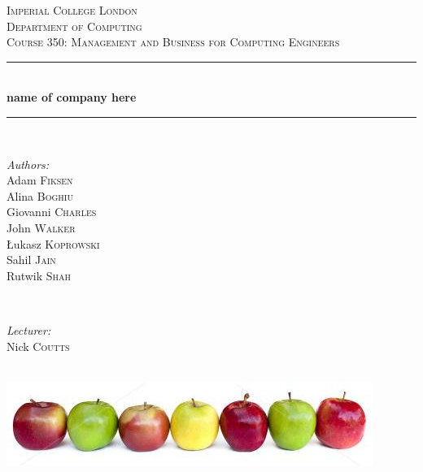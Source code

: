 \documentclass{article}
\begin{document}

\begin{titlepage}
\newcommand{\HRule}{\rule{\linewidth}{0.5mm}}
\center
\textsc{\LARGE Imperial College London}  \\[1.5cm]
\textsc{\Large Department of Computing}  \\[0.5cm]
\textsc{\large Course 350: Management and Business for Computing Engineers} \\[0.5cm]

\HRule \\[0.6cm]
{\huge \bfseries name of company here} \\[0.3cm]
\HRule \\[1.5cm]

\begin{minipage}{0.4\textwidth}

\begin{flushleft} \large \emph{Authors:} \\
Adam  \textsc{Fiksen}\\
Alina  \textsc{Boghiu}\\
Giovanni  \textsc{Charles}\\
John  \textsc{Walker}\\
\L ukasz \textsc{Koprowski}\\
Sahil  \textsc{Jain}\\
Rutwik  \textsc{Shah}\\
\end{flushleft}

\end{minipage}~
\begin{minipage}{0.4\textwidth}

\begin{flushright} \large \emph{Lecturer:} \\
Nick \textsc{Coutts}
\end{flushright}


\end{minipage}\\[4cm]

\includegraphics[width=\textwidth]{apples.jpg}

\end{titlepage}
\end{document}
